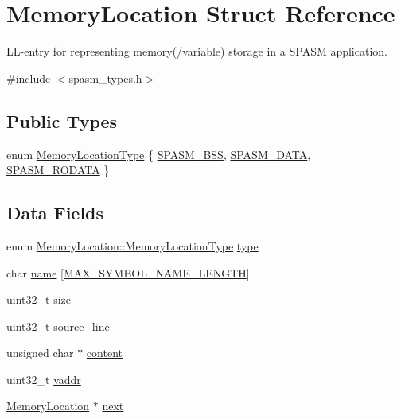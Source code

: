 \hypertarget{struct_memory_location}{\section{\-Memory\-Location \-Struct \-Reference}
\label{struct_memory_location}
}


\-L\-L-\/entry for representing memory(/variable) storage in a \-S\-P\-A\-S\-M application.  




{\ttfamily \#include $<$spasm\-\_\-types.\-h$>$}

\subsection*{\-Public \-Types}
\begin{DoxyCompactItemize}
\item 
enum \hyperlink{struct_memory_location_a6eda5c2bf0e7027732edc83358dfd7e6}{\-Memory\-Location\-Type} \{ \hyperlink{struct_memory_location_a6eda5c2bf0e7027732edc83358dfd7e6a344a415da0c2a368585758b12ecd775b}{\-S\-P\-A\-S\-M\-\_\-\-B\-S\-S}, 
\hyperlink{struct_memory_location_a6eda5c2bf0e7027732edc83358dfd7e6a8c90ed4d7671818c53be02fe6b35ce90}{\-S\-P\-A\-S\-M\-\_\-\-D\-A\-T\-A}, 
\hyperlink{struct_memory_location_a6eda5c2bf0e7027732edc83358dfd7e6a0ffce35af6bc5cc8ca5970d8361ed226}{\-S\-P\-A\-S\-M\-\_\-\-R\-O\-D\-A\-T\-A}
 \}
\end{DoxyCompactItemize}
\subsection*{\-Data \-Fields}
\begin{DoxyCompactItemize}
\item 
enum \*
\hyperlink{struct_memory_location_a6eda5c2bf0e7027732edc83358dfd7e6}{\-Memory\-Location\-::\-Memory\-Location\-Type} \hyperlink{struct_memory_location_a2736152232b8c5033a0ec806877105db}{type}
\item 
char \hyperlink{struct_memory_location_a320c498b87917320483f1ad58fe686a6}{name} \mbox{[}\hyperlink{spasm__types_8h_a0a00b7461a4fb4e2a8a38858aacb4303}{\-M\-A\-X\-\_\-\-S\-Y\-M\-B\-O\-L\-\_\-\-N\-A\-M\-E\-\_\-\-L\-E\-N\-G\-T\-H}\mbox{]}
\item 
uint32\-\_\-t \hyperlink{struct_memory_location_aa261f98a2bc22ff9dd6ce65415bdbe9e}{size}
\item 
uint32\-\_\-t \hyperlink{struct_memory_location_ad8776d9c07ac1dfafd46fc571800268a}{source\-\_\-line}
\item 
unsigned char $\ast$ \hyperlink{struct_memory_location_afef0e80245b6dadee968d5d3dc6e5c5c}{content}
\item 
uint32\-\_\-t \hyperlink{struct_memory_location_a925b7416925925d465bbbc162bb3bc4c}{vaddr}
\item 
\hyperlink{struct_memory_location}{\-Memory\-Location} $\ast$ \hyperlink{struct_memory_location_adacbfac647a59503828b699744046177}{next}
\end{DoxyCompactItemize}


